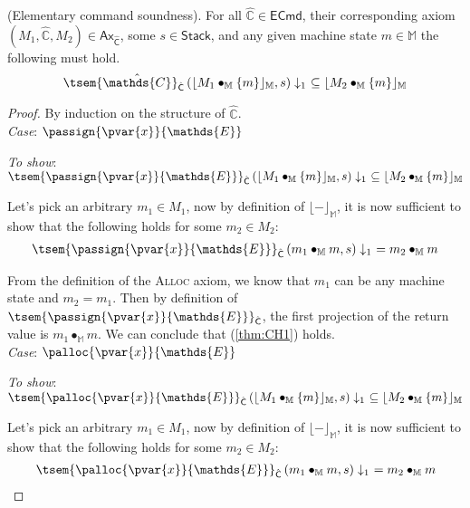 \thm \label{thm:eSound} (Elementary command soundness). For all $\hat{\mathds{C}} \in \mathsf{ECmd}$, their corresponding axiom $(M_1, \hat{\mathds{C}}, M_2) \in \mathsf{Ax}_{\hat{\mathsf{C}}}$, some $s \in \mathsf{Stack}$, and any given machine state $m \in \mathbb{M}$ the following must hold.
\[
	\tsem{\hat{\mathds{C}}}_{\hat{\mathsf{C}}} \left( \lfloor M_1 \bullet_\mathbb{M} \{m\} \rfloor_\mathbb{M}, s \right) \downarrow_1\ \subseteq \lfloor M_2 \bullet_\mathbb{M} \{m\} \rfloor_\mathbb{M}
\]
{\parindent0pt
\begin{proof}
By induction on the structure of $\hat{\mathds{C}}$. \\

\textit{Case}: $\passign{\pvar{x}}{\mathds{E}}$

\textit{To show}: $\tsem{\passign{\pvar{x}}{\mathds{E}}}_{\hat{\mathsf{C}}} \left( \lfloor M_1 \bullet_\mathbb{M} \{m\} \rfloor_\mathbb{M}, s \right) \downarrow_1\ \subseteq \lfloor M_2 \bullet_\mathbb{M} \{m\} \rfloor_\mathbb{M}$

Let's pick an arbitrary $m_1 \in M_1$, now by definition of $\lfloor - \rfloor_\mathbb{M}$, it is now sufficient to show that the following holds for some $m_2 \in M_2$:
\begin{gather}
	\label{thm:CH1} \tsem{\passign{\pvar{x}}{\mathds{E}}}_{\hat{\mathsf{C}}} \left(m_1 \bullet_\mathbb{M} m, s \right) \downarrow_1\ = m_2 \bullet_\mathbb{M} m
\end{gather}

From the definition of the \textsc{Alloc} axiom, we know that $m_1$ can be any machine state and $m_2 = m_1$. Then by definition of $\tsem{\passign{\pvar{x}}{\mathds{E}}}_{\hat{\mathsf{C}}}$, the first projection of the return value is $m_1 \bullet_\mathbb{M} m$. We can conclude that (\ref{thm:CH1}) holds.  \\

\textit{Case}: $\palloc{\pvar{x}}{\mathds{E}}$

\textit{To show}: $\tsem{\palloc{\pvar{x}}{\mathds{E}}}_{\hat{\mathsf{C}}} \left( \lfloor M_1 \bullet_\mathbb{M} \{m\} \rfloor_\mathbb{M}, s \right) \downarrow_1\ \subseteq \lfloor M_2 \bullet_\mathbb{M} \{m\} \rfloor_\mathbb{M}$

Let's pick an arbitrary $m_1 \in M_1$, now by definition of $\lfloor - \rfloor_\mathbb{M}$, it is now sufficient to show that the following holds for some $m_2 \in M_2$:
\begin{gather}
	\label{thm:CH3} \tsem{\palloc{\pvar{x}}{\mathds{E}}}_{\hat{\mathsf{C}}} \left(m_1 \bullet_\mathbb{M} m, s \right) \downarrow_1\ = m_2 \bullet_\mathbb{M} m
\end{gather}


\end{proof}}
